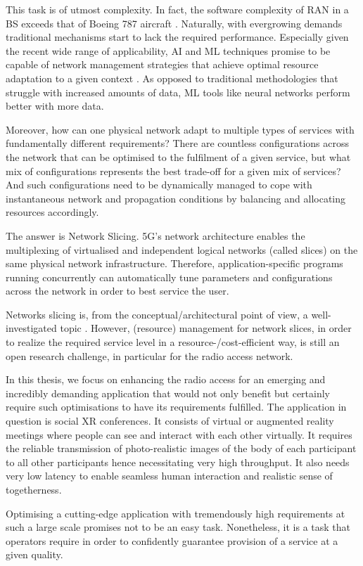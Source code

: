 This task is of utmost complexity. In fact, the software complexity of \ac{RAN} in a \ac{BS} exceeds that of Boeing 787 aircraft \cite{5facts_ericsson}. Naturally, with evergrowing demands traditional mechanisms start to lack the required performance. Especially given the recent wide range of applicability, \ac{AI} and \ac{ML} techniques promise to be capable of network management strategies that achieve optimal resource adaptation to a given context \cite{7792374}. As opposed to traditional methodologies that struggle with increased amounts of data, \ac{ML} tools like neural networks perform better with more data.

Moreover, how can one physical network adapt to multiple types of services with fundamentally different requirements?
There are countless configurations across the network that can be optimised to the fulfilment of a given service, but what mix of configurations represents the best trade-off for a given mix of services? And such configurations need to be dynamically managed to cope with instantaneous network and propagation conditions by balancing and allocating resources accordingly. 

The answer is Network Slicing. \ac{5G}'s network architecture enables the multiplexing of virtualised and independent logical networks (called slices) on the same physical network infrastructure. Therefore, application-specific programs running concurrently can automatically tune parameters and configurations across the network in order to best service the user.

Networks slicing is, from the conceptual/architectural point of view, a well-investigated topic \cite{slicing_survey}. However, (resource) management for network slices, in order to realize the required service level in a resource-/cost-efficient way, is still an open research challenge, in particular for the radio access network.

In this thesis, we focus on enhancing the radio access for an emerging and incredibly demanding application that would not only benefit but certainly require such optimisations to have its requirements fulfilled. The application in question is social \ac{XR} conferences. It consists of virtual or augmented reality meetings where people can see and interact with each other virtually. It requires the reliable transmission of photo-realistic images of the body of each participant to all other participants hence necessitating very high throughput. It also needs very low latency to enable seamless human interaction and realistic sense of togetherness.

Optimising a cutting-edge application with tremendously high requirements at such a large scale promises not to be an easy task. Nonetheless, it is a task that operators require in order to confidently guarantee provision of a service at a given quality.




